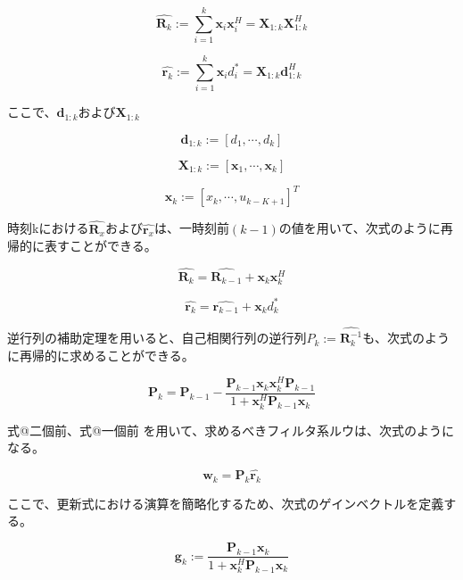 \begin{equation}
\hat{\bm{R}_k} := \sum_{i=1}^k \bm{x}_i \bm{x}_i^H = \bm{X}_{1:k} \bm{X}_{1:k}^H
\end{equation}

\begin{equation}
\hat{\bm{r}_k} := \sum_{i=1}^k \bm{x}_i d_i^* = \bm{X}_{1:k} \bm{d}_{1:k}^H
\end{equation}

ここで、\(\bm{d}_{1:k}\)および\(\bm{X}_{1:k}\)

\begin{equation}
\bm{d}_{1:k} := [d_1, \cdots, d_k]
\end{equation}

\begin{equation}
\bm{X}_{1:k} := [\bm{x}_1, \cdots, \bm{x}_k]
\end{equation}

\begin{equation}
\bm{x}_{k} := [x_k, \cdots, u_{k-K+1}]^T
\end{equation}

時刻kにおける\(\hat{\bm{R}_x}\)および\(\hat{\bm{r}_x}\)は、一時刻前\((k-1)\)の値を用いて、次式のように再帰的に表すことができる。


\begin{equation}
\hat{\bm{R}_k} = \hat{\bm{R}_{k-1}} + \bm{x}_k \bm{x}_k^H
\end{equation}


\begin{equation}
\hat{\bm{r}_k} = \hat{\bm{r}_{k-1}} + \bm{x}_k d_k^*
\end{equation}

逆行列の補助定理を用いると、自己相関行列の逆行列\(P_k := \hat{\bm{R}_k^{-1}}\)も、次式のように再帰的に求めることができる。


\begin{equation}
\bm{P}_k = \bm{P}_{k-1} - \frac{\bm{P}_{k-1} \bm{x}_k \bm{x}_k^H \bm{P}_{k-1}}{1 + \bm{x}_k^H \bm{P}_{k-1} \bm{x}_k} 
\end{equation}

式@二個前、式@一個前
を用いて、求めるべきフィルタ系ルウは、次式のようになる。

\begin{equation}
\bm{w}_k = \bm{P}_k \hat{\bm{r}_k}
\end{equation}


ここで、更新式における演算を簡略化するため、次式のゲインベクトルを定義する。

\begin{equation}
\bm{g}_k := \frac{\bm{P}_{k-1} \bm{x}_k}{1 + \bm{x}_k^H \bm{P}_{k-1} \bm{x}_k}
\end{equation}

